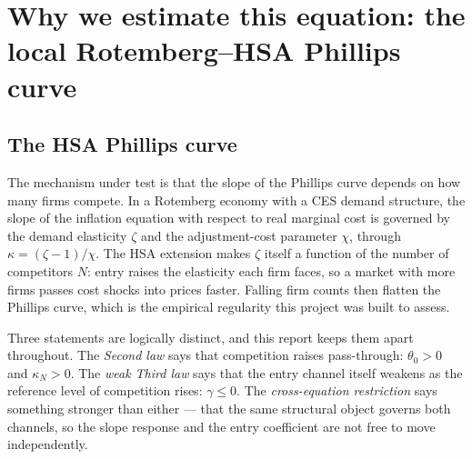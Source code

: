 \documentclass[11pt]{article}
\newcommand{\code}[1]{\texttt{#1}}
\begin{document}
\maketitle

\begin{abstract}
This restriction-version report is separate from \code{nkpc\_hsa\_report.pdf},
which remains the historical reduced-form and ablation report. The present
document asks one question: does the local Rotemberg--HSA cross-equation
restriction survive contact with the data? It compares a fixed-reference local
benchmark (F0) with an unrestricted moving-reference model (U), the
cross-restricted model (R1), its weak Third-law extension (R2), and a
constant-pass-through benchmark (R3), on \TheoryObservationCount{} quarters from
\TheorySampleStart{} to \TheorySampleEnd. Every numerical table, figure and
in-text number is generated from the signed theory-run namespace; historical
artifacts are never substituted for a missing current run.
\end{abstract}

\tableofcontents

\section{Why we estimate this equation: the local Rotemberg--HSA Phillips curve}

\subsection{The HSA Phillips curve}
The mechanism under test is that the slope of the Phillips curve depends on how
many firms compete. In a Rotemberg economy with a CES demand structure, the
slope of the inflation equation with respect to real marginal cost is governed
by the demand elasticity $\zeta$ and the adjustment-cost parameter $\chi$,
through $\kappa=(\zeta-1)/\chi$. The HSA extension makes $\zeta$ itself a
function of the number of competitors $N$: entry raises the elasticity each
firm faces, so a market with more firms passes cost shocks into prices faster.
Falling firm counts then flatten the Phillips curve, which is the empirical
regularity this project was built to assess.

Three statements are logically distinct, and this report keeps them apart
throughout. The \emph{Second law} says that competition raises pass-through:
$\theta_0>0$ and $\kappa_N>0$. The \emph{weak Third law} says that the entry
channel itself weakens as the reference level of competition rises:
$\gamma\le0$. The \emph{cross-equation restriction} says something stronger
than either --- that the same structural object governs both channels, so the
slope response and the entry coefficient are not free to move independently.
\end{document}
